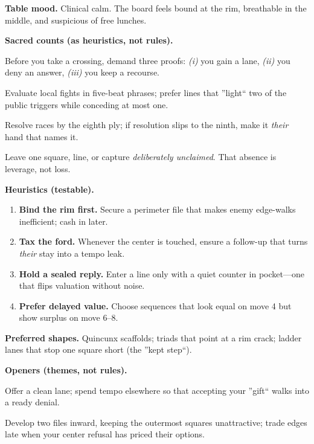 \documentclass[11pt]{article}
\numberwithin{equation}{section} %
\theoremstyle{plain} %
\theoremstyle{definition} %
\theoremstyle{remark} %
\begin{document}
\medskip
\noindent\textbf{Table mood.} Clinical calm. The board feels bound at the rim, breathable in the middle, and suspicious of free lunches.

\medskip
\noindent\textbf{Sacred counts (as heuristics, not rules).}
\begin{description}\setlength\itemsep{0.35em}
  \item[\textbf{3} --- Proof.] Before you take a crossing, demand three proofs: \emph{(i)} you gain a lane, \emph{(ii)} you deny an answer, \emph{(iii)} you keep a recourse.
  \item[\textbf{5} --- Candles.] Evaluate local fights in five-beat phrases; prefer lines that ''light`` two of the public triggers while conceding at most one.
  \item[\textbf{8} --- Work.] Resolve races by the eighth ply; if resolution slips to the ninth, make it \emph{their} hand that names it.
  \item[\textbf{9} --- Remaining.] Leave one square, line, or capture \emph{deliberately unclaimed}. That absence is leverage, not loss.
\end{description}

\medskip
\noindent\textbf{Heuristics (testable).}
\begin{enumerate}\setlength\itemsep{0.25em}
  \item \textbf{Bind the rim first.} Secure a perimeter file that makes enemy edge-walks inefficient; cash in later.
  \item \textbf{Tax the ford.} Whenever the center is touched, ensure a follow-up that turns \emph{their} stay into a tempo leak.
  \item \textbf{Hold a sealed reply.} Enter a line only with a quiet counter in pocket---one that flips valuation without noise.
  \item \textbf{Prefer delayed value.} Choose sequences that look equal on move 4 but show surplus on move 6--8.
\end{enumerate}

\medskip
\noindent\textbf{Preferred shapes.} Quincunx scaffolds; triads that point at a rim crack; ladder lanes that stop one square short (the ''kept step``).

\medskip
\noindent\textbf{Openers (themes, not rules).}
\begin{description}\setlength\itemsep{0.35em}
  \item[\textit{Copper Ledger.}] Offer a clean lane; spend tempo elsewhere so that accepting your ''gift`` walks into a ready denial.
  \item[\textit{Salt Ring.}] Develop two files inward, keeping the outermost squares unattractive; trade edges late when your center refusal has priced their options.
\end{description}
\end{document}
